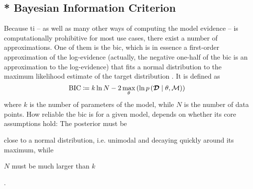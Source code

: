 \documentclass[\relativeRoot/main.tex]{subfiles}
\begin{document}
\subsection{* Bayesian Information Criterion}
\label{subsec:graph:model_comp:bic}

Because \acrlong{ti} -- as well as many other ways of computing the model evidence -- is computationally prohibitive for most use cases, there exist a number of approximations. One of them is the \gls{bic}, which is in essence a first-order approximation of the log-evidence (actually, the negative one-half of the \gls{bic} is an approximation to the log-evidence) that fits a normal distribution to the maximum likelihood estimate of the target distribution \cite{schwarz_estimating_1978}. It is defined as
%
\begin{equation} \label{eq:bic}
    \text{BIC} \coloneqq k \ln{N} - 2 \max_\theta{ \left( \ln{ p \left( \boldsymbol{\mathcal{D}} \mid \theta, \mathcal{M} \right) } \right)}
\end{equation}
%
where $k$ is the number of parameters of the model, while $N$ is the number of data points. How reliable the \gls{bic} is for a given model, depends on whether its core assumptions hold: The posterior must be 
\begin{enumerate*}[label={(\arabic*)}]
    \item close to a normal distribution, i.e. unimodal and decaying quickly around its maximum, while
    \item $N$ must be much larger than $k$
\end{enumerate*}
\cite{bhat_derivation_2010}.
\end{document}
